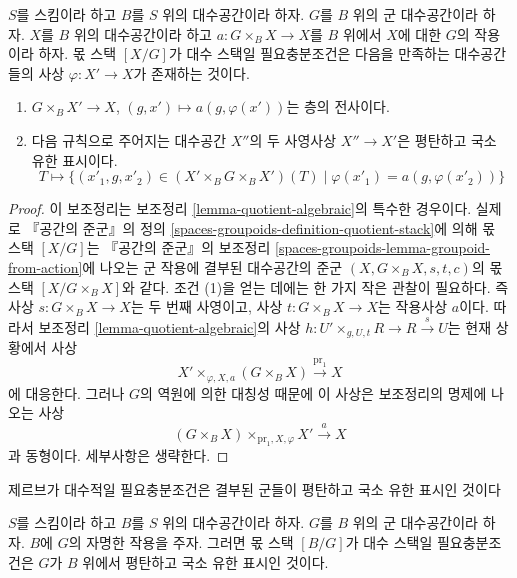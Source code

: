 \begin{lemma}
\label{lemma-group-quotient-algebraic}
$S$를 스킴이라 하고 $B$를 $S$ 위의 대수공간이라 하자.
$G$를 $B$ 위의 군 대수공간이라 하자. $X$를 $B$ 위의 대수공간이라
하고 $a : G \times_B X \to X$를 $B$ 위에서 $X$에 대한 $G$의
작용이라 하자. 몫 스택 $[X/G]$가 대수 스택일 필요충분조건은 다음을
만족하는 대수공간들의 사상 $\varphi : X' \to X$가 존재하는 것이다.
\begin{enumerate}
\item $G \times_B X' \to X$, $(g, x') \mapsto a(g, \varphi(x'))$는
층의 전사이다.
\item 다음 규칙으로 주어지는 대수공간 $X''$의 두 사영사상
$X'' \to X'$은 평탄하고 국소 유한 표시이다.
$$
T \longmapsto \{(x'_1, g, x'_2) \in (X' \times_B G \times_B X')(T)
\mid \varphi(x'_1) = a(g, \varphi(x'_2))\}
$$
\end{enumerate}
\end{lemma}

\begin{proof}
이 보조정리는 보조정리 \ref{lemma-quotient-algebraic}의 특수한 경우이다.
실제로 『공간의 준군』의 정의
\ref{spaces-groupoids-definition-quotient-stack}에 의해 몫 스택 $[X/G]$는
『공간의 준군』의 보조정리
\ref{spaces-groupoids-lemma-groupoid-from-action}에 나오는 군 작용에 결부된
대수공간의 준군 $(X, G \times_B X, s, t, c)$의 몫 스택
$[X/G \times_B X]$와 같다. 조건 (1)을 얻는 데에는 한 가지 작은 관찰이
필요하다. 즉 사상 $s : G \times_B X \to X$는 두 번째 사영이고,
사상 $t :  G \times_B X \to X$는 작용사상 $a$이다. 따라서 보조정리
\ref{lemma-quotient-algebraic}의 사상
$h : U' \times_{g, U, t} R \to R \xrightarrow{s} U$는 현재 상황에서 사상
$$
X' \times_{\varphi, X, a} (G \times_B X) \xrightarrow{\text{pr}_1} X
$$
에 대응한다. 그러나 $G$의 역원에 의한 대칭성 때문에 이 사상은
보조정리의 명제에 나오는 사상
$$
(G \times_B X) \times_{\text{pr}_1, X, \varphi} X' \xrightarrow{a} X
$$
과 동형이다. 세부사항은 생략한다.
\end{proof}

\begin{lemma}
\label{lemma-BG-algebraic}
\begin{slogan}
제르브가 대수적일 필요충분조건은 결부된 군들이 평탄하고
국소 유한 표시인 것이다
\end{slogan}
$S$를 스킴이라 하고 $B$를 $S$ 위의 대수공간이라 하자.
$G$를 $B$ 위의 군 대수공간이라 하자. $B$에 $G$의 자명한 작용을
주자. 그러면 몫 스택 $[B/G]$가 대수 스택일 필요충분조건은
$G$가 $B$ 위에서 평탄하고 국소 유한 표시인 것이다.
\end{lemma}

